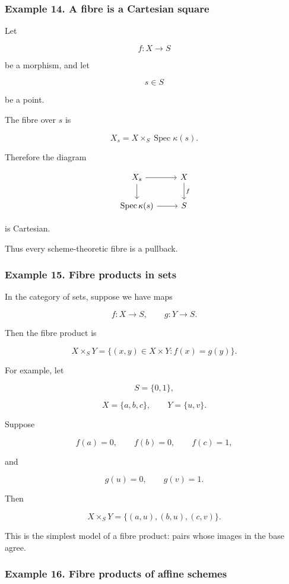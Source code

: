 \documentclass[12pt,a4paper]{article}
\theoremstyle{notespace}
\begin{document}
\subsubsection{Example 14. A fibre is a Cartesian square}

Let

\[
f:X\to S
\]

be a morphism, and let

\[
s\in S
\]

be a point.

The fibre over \(s\) is

\[
X_s=X\times_S \operatorname{Spec}\kappa(s).
\]

Therefore the diagram

\[
\begin{tikzcd}
	X_s \arrow[r] \arrow[d] & X \arrow[d,"f"] \\
	\operatorname{Spec}\kappa(s) \arrow[r] & S
\end{tikzcd}
\]

is Cartesian.

Thus every scheme-theoretic fibre is a pullback.

\subsubsection{Example 15. Fibre products in sets}

In the category of sets, suppose we have maps

\[
f:X\to S,
\qquad
g:Y\to S.
\]

Then the fibre product is

\[
X\times_S Y
=
\{(x,y)\in X\times Y : f(x)=g(y)\}.
\]

For example, let

\[
S=\{0,1\},
\]

\[
X=\{a,b,c\},
\qquad
Y=\{u,v\}.
\]

Suppose

\[
f(a)=0,
\qquad
f(b)=0,
\qquad
f(c)=1,
\]

and

\[
g(u)=0,
\qquad
g(v)=1.
\]

Then

\[
X\times_S Y
=
\{(a,u),(b,u),(c,v)\}.
\]

This is the simplest model of a fibre product: pairs whose images in the base agree.

\subsubsection{Example 16. Fibre products of affine schemes}
\end{document}
